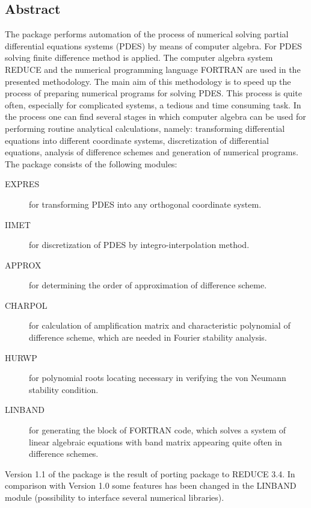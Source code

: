 

\subsection{Abstract}


     The   package performs  automation of  the process of numerical
solving  partial  differential  equations  systems  (PDES)  by  means of
computer algebra.  For PDES solving finite difference method is applied.
The  computer  algebra  system  REDUCE  and  the  numerical  programming
language FORTRAN  are used in the presented methodology. The main aim of
this methodology is to  speed  up  the  process  of  preparing numerical
programs for  solving PDES.  This process is quite often, especially for
complicated systems, a tedious and time consuming task.
     In the process  one  can  find  several  stages  in  which computer
algebra  can  be  used  for  performing routine analytical calculations,
namely: transforming differential  equations  into  different coordinate
systems,   discretization   of   differential   equations,  analysis  of
difference  schemes  and  generation  of  numerical  programs.  The 
package consists of the following modules:
\begin{description}
  \item[EXPRES]  for transforming PDES into any orthogonal coordinate system.
  \item[IIMET]   for discretization of PDES by integro-interpolation method.
  \item[APPROX]  for determining the order of approximation of difference
          scheme.
  \item[CHARPOL] for calculation of amplification matrix and characteristic
          polynomial of difference scheme, which are needed in Fourier
          stability analysis.
  \item[HURWP]   for polynomial roots locating necessary in verifying the von
          Neumann stability condition.
  \item[LINBAND] for generating the block of FORTRAN code, which solves a
          system of linear algebraic equations with band matrix
          appearing quite often in difference schemes.
\end{description}
     Version  1.1  of  the    package  is the result of porting 
package to REDUCE 3.4. In comparison with Version 1.0 some features  has
been changed  in the  LINBAND module  (possibility to  interface several
numerical libraries).

